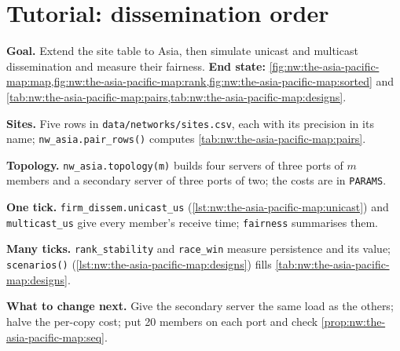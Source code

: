 \section{Tutorial: dissemination order}\label{tut:nw:the-asia-pacific-map:tut}

\begin{tutorial}
\textbf{Goal.} Extend the site table to Asia, then simulate unicast and multicast dissemination and measure their fairness.
\textbf{End state:} \cref{fig:nw:the-asia-pacific-map:map,fig:nw:the-asia-pacific-map:rank,fig:nw:the-asia-pacific-map:sorted} and
\cref{tab:nw:the-asia-pacific-map:pairs,tab:nw:the-asia-pacific-map:designs}.
\begin{tutsteps}
\item \textbf{Sites.} Five rows in \texttt{data/networks/sites.csv}, each with its precision in its name; \texttt{nw\_asia.pair\_rows()} computes
  \cref{tab:nw:the-asia-pacific-map:pairs}.
\item \textbf{Topology.} \texttt{nw\_asia.topology(m)} builds four servers of three ports of $m$ members and a secondary server of three ports of
  two; the costs are in \texttt{PARAMS}.
\item \textbf{One tick.} \texttt{firm\_dissem.unicast\_us} (\cref{lst:nw:the-asia-pacific-map:unicast}) and \texttt{multicast\_us} give every
  member's receive time; \texttt{fairness} summarises them.
\item \textbf{Many ticks.} \texttt{rank\_stability} and \texttt{race\_win} measure persistence and its value; \texttt{scenarios()}
  (\cref{lst:nw:the-asia-pacific-map:designs}) fills \cref{tab:nw:the-asia-pacific-map:designs}.
\end{tutsteps}
\textbf{What to change next.} Give the secondary server the same load as the others; halve the per-copy cost; put 20 members on each port and
check \cref{prop:nw:the-asia-pacific-map:seq}.
\end{tutorial}

